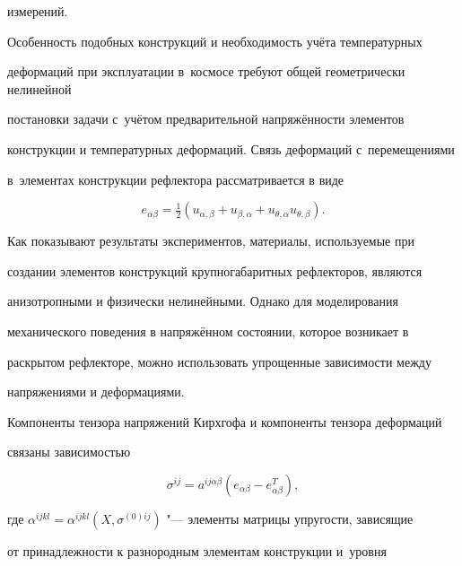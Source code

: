 измерений. 




Особенность подобных конструкций и необходимость учёта температурных 

деформаций при эксплуатации в~космосе требуют общей геометрически нелинейной 

постановки задачи с~учётом предварительной напряжённости элементов 

конструкции и температурных деформаций. Связь деформаций с~перемещениями 

в~элементах конструкции рефлектора рассматривается в виде

\begin{equation*}

\label{belkov:eq1} 

e_{\alpha \beta } =\tfrac12(u_{\alpha ,\beta } +u_{\beta ,\alpha } +u_{\theta 

,\alpha } u_{\theta ,\beta } ).

\end{equation*}



Как показывают результаты экспериментов, материалы, используемые при 

создании элементов конструкций крупногабаритных рефлекторов, являются 

анизотропными и физически нелинейными. Однако для моделирования 

механического поведения в напряжённом состоянии, которое возникает в 

раскрытом рефлекторе, можно использовать упрощенные зависимости между 

напряжениями и деформациями.



Компоненты тензора напряжений Кирхгофа и компоненты тензора деформаций 

связаны зависимостью

\begin{equation*}

\label{belkov:eq2}

\sigma ^{ij}=a^{ij\alpha \beta }(e_{\alpha \beta } -e_{\alpha \beta }^T ),

\end{equation*}

где $\alpha^{ijkl}= \alpha ^{ijkl}(X, \sigma ^{(0)ij})$ "--- элементы матрицы упругости, зависящие 

от принадлежности к разнородным элементам конструкции и~уровня 


